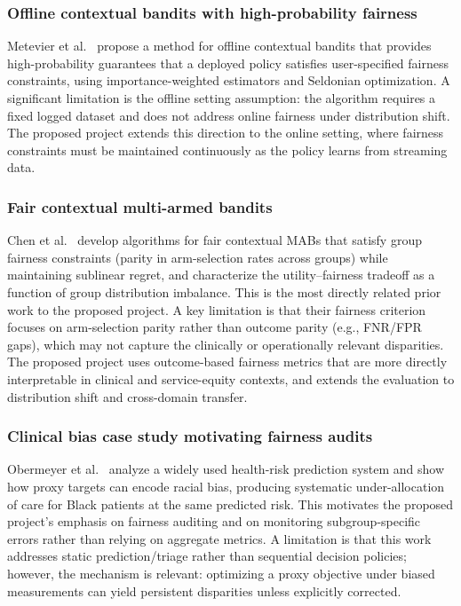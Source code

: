 \documentclass[conference]{IEEEtran}
\begin{document}
\subsubsection{Offline contextual bandits with high-probability fairness}
Metevier et al.~\cite{metevier2019offline} propose a method for offline contextual bandits
that provides high-probability guarantees that a deployed policy satisfies user-specified
fairness constraints, using importance-weighted estimators and Seldonian optimization.
A significant limitation is the offline setting assumption: the algorithm requires a fixed
logged dataset and does not address online fairness under distribution shift. The proposed
project extends this direction to the online setting, where fairness constraints must be
maintained continuously as the policy learns from streaming data.

\subsubsection{Fair contextual multi-armed bandits}
Chen et al.~\cite{chen2020fair} develop algorithms for fair contextual MABs that satisfy
group fairness constraints (parity in arm-selection rates across groups) while maintaining
sublinear regret, and characterize the utility--fairness tradeoff as a function of group
distribution imbalance. This is the most directly related prior work to the proposed project.
A key limitation is that their fairness criterion focuses on arm-selection parity rather than
outcome parity (e.g., FNR/FPR gaps), which may not capture the clinically or operationally
relevant disparities. The proposed project uses outcome-based fairness metrics that are more
directly interpretable in clinical and service-equity contexts, and extends the evaluation to
distribution shift and cross-domain transfer.

\subsubsection{Clinical bias case study motivating fairness audits}
Obermeyer et al.~\cite{obermeyer2019dissecting} analyze a widely used health-risk prediction
system and show how proxy targets can encode racial bias, producing systematic under-allocation
of care for Black patients at the same predicted risk. This motivates the proposed project's
emphasis on fairness auditing and on monitoring subgroup-specific errors rather than relying
on aggregate metrics. A limitation is that this work addresses static prediction/triage rather
than sequential decision policies; however, the mechanism is relevant: optimizing a proxy
objective under biased measurements can yield persistent disparities unless explicitly
corrected.
\end{document}
